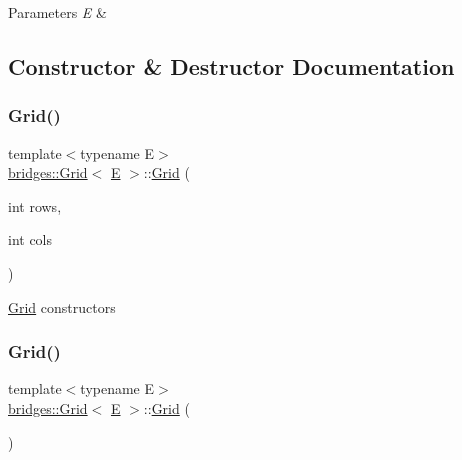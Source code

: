 \begin{DoxyParams}{Parameters}
{\em E} & \\
\hline
\end{DoxyParams}


\subsection{Constructor \& Destructor Documentation}
\mbox{\label{classbridges_1_1_grid_af8bb9244c4c713f2325af6d4754ad1e9}} 
\subsubsection{\texorpdfstring{Grid()}{Grid()}\hspace{0.1cm}{\footnotesize\ttfamily [1/4]}}
{\footnotesize\ttfamily template$<$typename E$>$ \\
\mbox{\hyperlink{classbridges_1_1_grid}{bridges\+::\+Grid}}$<$ \mbox{\hyperlink{namespacebridges_acfb0a4f7877d8f63de3e6862004c50eda3a3ea00cfc35332cedf6e5e9a32e94da}{E}} $>$\+::\mbox{\hyperlink{classbridges_1_1_grid}{Grid}} (\begin{DoxyParamCaption}\item[{int}]{rows,  }\item[{int}]{cols }\end{DoxyParamCaption})\hspace{0.3cm}{\ttfamily [inline]}}

\mbox{\hyperlink{classbridges_1_1_grid}{Grid}} constructors \mbox{\label{classbridges_1_1_grid_a711e05a933c2a11c9e2775c74e6cf80d}} 
\subsubsection{\texorpdfstring{Grid()}{Grid()}\hspace{0.1cm}{\footnotesize\ttfamily [2/4]}}
{\footnotesize\ttfamily template$<$typename E$>$ \\
\mbox{\hyperlink{classbridges_1_1_grid}{bridges\+::\+Grid}}$<$ \mbox{\hyperlink{namespacebridges_acfb0a4f7877d8f63de3e6862004c50eda3a3ea00cfc35332cedf6e5e9a32e94da}{E}} $>$\+::\mbox{\hyperlink{classbridges_1_1_grid}{Grid}} (\begin{DoxyParamCaption}{ }\end{DoxyParamCaption})\hspace{0.3cm}{\ttfamily [inline]}}

